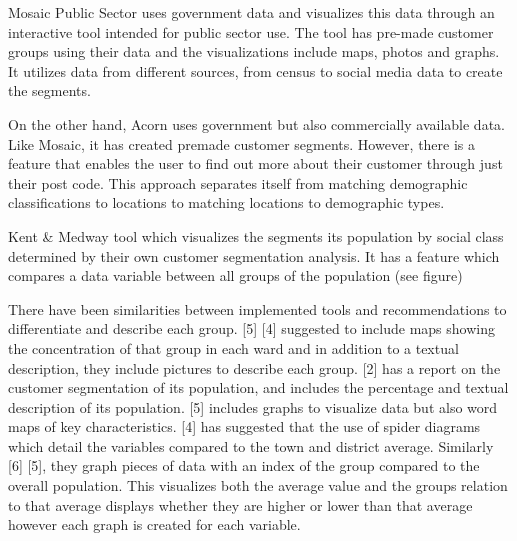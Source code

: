 Mosaic Public Sector uses government data and visualizes this data through an interactive tool intended for public sector use. The tool has pre-made customer groups using their data and the visualizations include maps, photos and graphs. It utilizes data from different sources, from census to social media data to create the segments. \par

On the other hand, Acorn uses government but also commercially available data. Like Mosaic, it has created premade customer segments. However, there is a feature that enables the user to find out more about their customer through just their post code. This approach separates itself from matching demographic classifications to locations to matching locations to demographic types. \par

Kent \& Medway tool which visualizes the segments its population by social class determined by their own customer segmentation analysis. It has a feature which compares a data variable between all groups of the population (see figure)\par

There have been similarities between implemented tools and recommendations to differentiate and describe each group. [5] [4] suggested to include maps showing the concentration of that group in each ward and in addition to a textual description, they include pictures to describe each group. [2] has a report on the customer segmentation of its population, and includes the percentage and textual description of its population. [5] includes graphs to visualize data but also word maps of key characteristics. [4] has suggested that the use of spider diagrams which detail the variables compared to the town and district average. Similarly [6] [5], they graph pieces of data with an index of the group compared to the overall population. This visualizes both the average value and the groups relation to that average displays whether they are higher or lower than that average however each graph is created for each variable.

